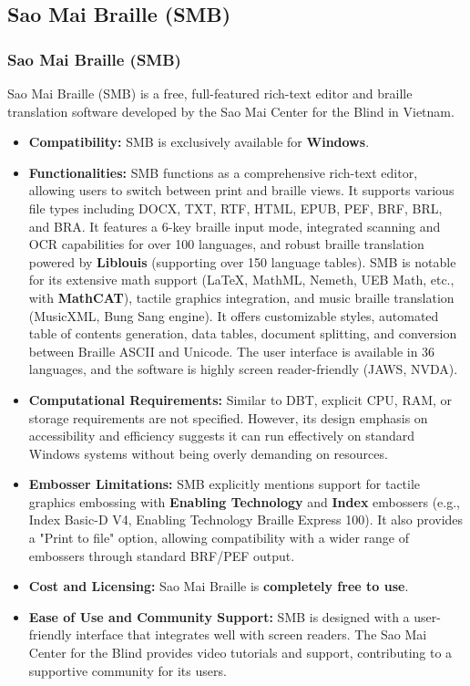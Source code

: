 \subsection{Sao Mai Braille (SMB)}
\subsubsection{Sao Mai Braille (SMB)}
Sao Mai Braille (SMB) is a free, full-featured rich-text editor and braille translation software developed by the Sao Mai Center for the Blind in Vietnam.

\vspace{1em}
\begin{itemize}
\item \textbf{Compatibility:} SMB is exclusively available for \textbf{Windows}\footnotemark[9].
\item \textbf{Functionalities:} SMB functions as a comprehensive rich-text editor, allowing users to switch between print and braille views. It supports various file types including DOCX, TXT, RTF, HTML, EPUB, PEF, BRF, BRL, and BRA. It features a 6-key braille input mode, integrated scanning and OCR capabilities for over 100 languages, and robust braille translation powered by \textbf{Liblouis} (supporting over 150 language tables). SMB is notable for its extensive math support (LaTeX, MathML, Nemeth, UEB Math, etc., with \textbf{MathCAT}), tactile graphics integration, and music braille translation (MusicXML, Bung Sang engine). It offers customizable styles, automated table of contents generation, data tables, document splitting, and conversion between Braille ASCII and Unicode. The user interface is available in 36 languages, and the software is highly screen reader-friendly (JAWS, NVDA)\footnotemark[9].
\item \textbf{Computational Requirements:} Similar to DBT, explicit CPU, RAM, or storage requirements are not specified. However, its design emphasis on accessibility and efficiency suggests it can run effectively on standard Windows systems without being overly demanding on resources.
\item \textbf{Embosser Limitations:} SMB explicitly mentions support for tactile graphics embossing with \textbf{Enabling Technology} and \textbf{Index} embossers (e.g., Index Basic-D V4, Enabling Technology Braille Express 100). It also provides a "Print to file" option, allowing compatibility with a wider range of embossers through standard BRF/PEF output\footnotemark[9].
\item \textbf{Cost and Licensing:} Sao Mai Braille is \textbf{completely free to use}\footnotemark[9].
\item \textbf{Ease of Use and Community Support:} SMB is designed with a user-friendly interface that integrates well with screen readers. The Sao Mai Center for the Blind provides video tutorials and support, contributing to a supportive community for its users\footnotemark[9].
\end{itemize}
\vspace{1em}

